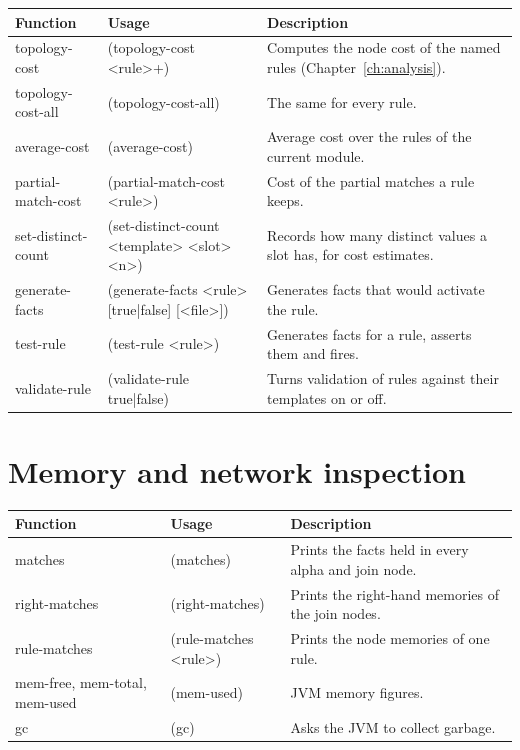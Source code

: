\begin{longtable}{>{\ttfamily\raggedright\arraybackslash}p{1.45in} >{\ttfamily\small\raggedright\arraybackslash}p{2.05in} >{\raggedright\arraybackslash}p{2.5in}}
\toprule
\normalfont Function & \normalfont Usage & Description \\
\midrule
\endhead
topology-cost & (topology-cost <rule>+) & Computes the node cost of the named rules (Chapter~\ref{ch:analysis}). \\
topology-\br{}cost-\br{}all & (topology-cost-all) & The same for every rule. \\
average-cost & (average-cost) & Average cost over the rules of the current module. \\
partial-\br{}match-\br{}cost & (partial-match-cost <rule>) & Cost of the partial matches a rule keeps. \\
set-\br{}distinct-\br{}count & (set-distinct-count <template> <slot> <n>) & Records how many distinct values a slot has, for cost estimates. \\
generate-facts & (generate-facts <rule> [true|false] [<file>]) & Generates facts that would activate the rule. \\
test-rule & (test-rule <rule>) & Generates facts for a rule, asserts them and fires. \\
validate-rule & (validate-rule true|false) & Turns validation of rules against their templates on or off. \\
\bottomrule
\end{longtable}

\section{Memory and network inspection}

\begin{longtable}{>{\ttfamily\raggedright\arraybackslash}p{1.45in} >{\ttfamily\small\raggedright\arraybackslash}p{2.05in} >{\raggedright\arraybackslash}p{2.5in}}
\toprule
\normalfont Function & \normalfont Usage & Description \\
\midrule
\endhead
matches & (matches) & Prints the facts held in every alpha and join node. \\
right-matches & (right-matches) & Prints the right-hand memories of the join nodes. \\
rule-matches & (rule-matches <rule>) & Prints the node memories of one rule. \\
mem-\br{}free, mem-\br{}total, mem-\br{}used & (mem-used) & JVM memory figures. \\
gc & (gc) & Asks the JVM to collect garbage. \\
\bottomrule
\end{longtable}

